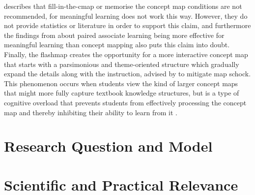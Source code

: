 





 describes that fill-in-the-cmap or memorise the concept map conditions are not recommended, for meaningful learning does not work this way. However, they do not provide statistics or literature in order to support this claim, and furthermore the findings from  about paired associate learning being more effective for meaningful learning than concept mapping also puts this claim into doubt. Finally, the flashmap creates the opportunity for a more interactive concept map that starts with a parsimonious and theme-oriented structure which gradually expand the details along with the instruction, advised by  to mitigate map schock. This phenomenon occurs when students view the kind of larger concept maps that might more fully capture textbook knowledge structures, but is a type of cognitive overload that prevents students from effectively processing the concept map and thereby inhibiting their ability to learn from it \cite{moore}.

\section{Research Question and Model}


\section{Scientific and Practical Relevance}



